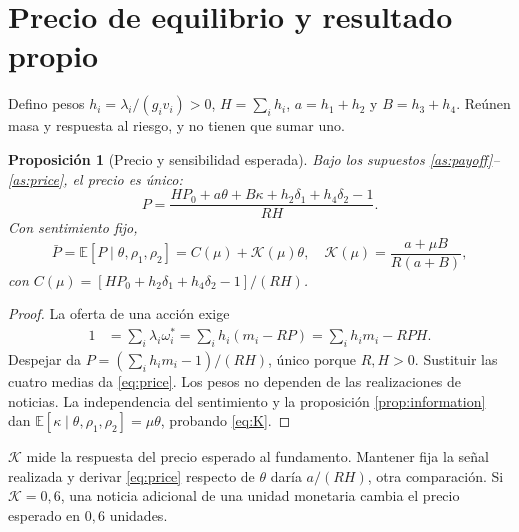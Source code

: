 \documentclass[11pt]{article}
\newcommand{\E}{\mathbb E}
\newcommand{\K}{\mathcal K}
\newtheorem{proposition}{Proposición}
\begin{document}
\section{Precio de equilibrio y resultado propio}
Defino pesos $h_i=\lambda_i/(g_iv_i)>0$, $H=\sum_i h_i$,
$a=h_1+h_2$ y $B=h_3+h_4$. Reúnen masa y respuesta al riesgo, y no tienen
que sumar uno.
\begin{proposition}[Precio y sensibilidad esperada]\label{prop:price}
Bajo los supuestos \ref{as:payoff}--\ref{as:price}, el precio es único:
\begin{equation}\label{eq:price}
 P=\frac{HP_0+a\theta+B\kappa+h_2\delta_1+h_4\delta_2-1}{RH}.
\end{equation}
Con sentimiento fijo,
\begin{equation}\label{eq:K}
 \bar P=\E[P\mid\theta,\rho_1,\rho_2]=C(\mu)+\K(\mu)\theta,\quad
 \K(\mu)=\frac{a+\mu B}{R(a+B)},
\end{equation}
con $C(\mu)=[HP_0+h_2\delta_1+h_4\delta_2-1]/(RH)$.
\end{proposition}
\begin{proof}
La oferta de una acción exige
\begin{align}
 1&=\sum_i\lambda_i\omega_i^*
   =\sum_i h_i(m_i-RP)=\sum_i h_i m_i-RPH.
\end{align}
Despejar da $P=(\sum_i h_i m_i-1)/(RH)$, único porque $R,H>0$.
Sustituir las cuatro medias da \eqref{eq:price}. Los pesos no dependen de
las realizaciones de noticias. La independencia del sentimiento y la
proposición \ref{prop:information} dan
$\E[\kappa\mid\theta,\rho_1,\rho_2]=\mu\theta$, probando \eqref{eq:K}.
\end{proof}
$\K$ mide la respuesta del precio esperado al fundamento. Mantener fija
la señal realizada y derivar \eqref{eq:price} respecto de $\theta$ daría
$a/(RH)$, otra comparación. Si $\K=0{,}6$, una noticia adicional de una
unidad monetaria cambia el precio esperado en $0{,}6$ unidades.
\end{document}
